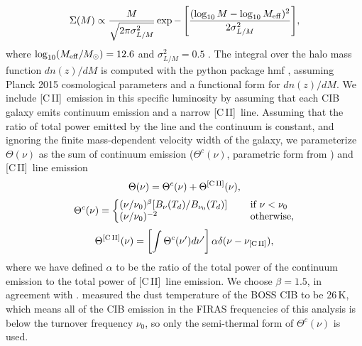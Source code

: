 \documentclass[fleqn,usenatbib]{mnras}
\newcommand{\cii}{[C{\sc\,II}]}
\begin{document}
\begin{equation}
\Sigma(M) \propto \frac{M}{\sqrt{2\pi\sigma^2_{L/M}}}\exp{-\left[\frac{(\log_{10}M - \log_{10}M_{\rm eff})^2}{2\sigma^2_{L/M}}\right]},
\end{equation}
where $\log_{10}(M_{\rm eff}/M_{\odot}) = 12.6$ \citep{Planck2014, serra2016dissecting} and $\sigma^2_{L/M}=0.5$ \citep{10.1111/j.1365-2966.2012.20510.x, Planck2014, serra2016dissecting}. The integral over the halo mass function $dn(z)/dM$ is computed with the python package hmf \citep{2014ascl.soft12006M}, assuming Planck 2015 \citep{Ade:2015xua} cosmological parameters and a \cite{2008ApJ...688..709T} functional form for $dn(z)/dM$.
We include \cii\ emission in this specific luminosity by assuming that each CIB galaxy emits continuum emission and a narrow \cii\ line. Assuming that the ratio of total power emitted by the line and the continuum is constant, and ignoring the finite mass-dependent velocity width of the galaxy, we parameterize $\Theta(\nu)$ as the sum of continuum emission ($\Theta^c(\nu)$, parametric form from \cite{10.1111/j.1365-2966.2012.20510.x}) and \cii\ line emission
\begin{equation}
\Theta(\nu) = \Theta^c(\nu) + \Theta^{\rm \cii}(\nu),
\end{equation}
\begin{equation*}
\Theta^c(\nu) = \left\{
  \begin{array}{@{}ll@{}}
    (\nu/\nu_0)^{\beta}[B_{\nu}(T_d)/B_{\nu_0}(T_d)] & \text{~~~~if}\ \nu<\nu_0 \\
    (\nu/\nu_0)^{-2} & \text{~~~~otherwise},
  \end{array}\right. \nonumber 
\end{equation*}
\begin{equation*}
\Theta^{\rm \cii}(\nu) = \left[\int\Theta^c(\nu')d\nu'\right]\alpha\delta(\nu -\nu_{\rm \cii}), \nonumber
\end{equation*}
where we have defined $\alpha$ to be the ratio of the total power of the continuum emission to the total power of \cii\ line emission. We choose $\beta=1.5$, in agreement with \cite{2014A&A...566A..55P}. \cite{2014A&A...570A..98S} measured the dust temperature of the BOSS CIB to be 26\,K, which means all of the CIB emission in the FIRAS frequencies of this analysis is below the turnover frequency $\nu_0$, so only the semi-thermal form of $\Theta^c(\nu)$ is used. 
\end{document}
